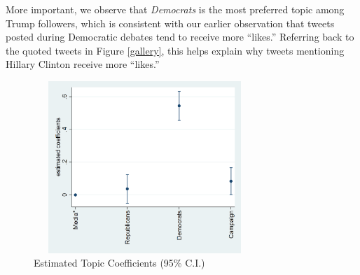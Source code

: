 \documentclass[letterpaper]{article}
\begin{document}
More important, we observe that \textit{Democrats} is the most preferred topic among Trump followers, which is consistent with our earlier observation that tweets posted during Democratic debates tend to receive more ``likes.'' Referring back to the quoted tweets in Figure \ref{gallery}, this helps explain why tweets mentioning Hillary Clinton receive more ``likes.''



\begin{figure}[H]
\caption{Estimated Topic Coefficients (95\% C.I.)}
\label{dailyPattern}
\includegraphics[height=6.5cm,width=8.4cm]{estimated_coefficients_revised.png}
\end{figure}


\end{document}
